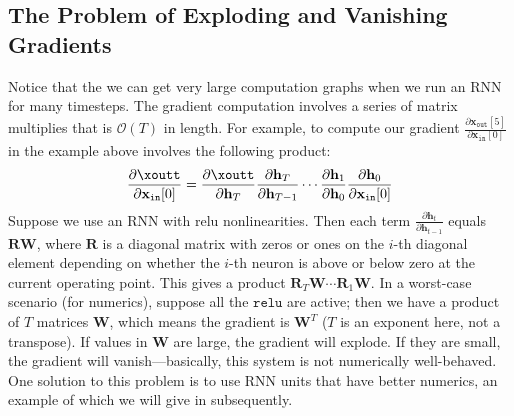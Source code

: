 \subsection{The Problem of Exploding and Vanishing Gradients}
\label{sec:recurrent_neural_networks:bptt} 

Notice that the we can get very large computation graphs when we run an RNN for many timesteps. The gradient computation involves a series of matrix multiplies that is $\mathcal{O}(T)$ in length. For example, to compute our gradient $\frac{\partial \mathbf{x}_{\texttt{out}}[5]}{\partial \mathbf{x}_{\texttt{in}}[0]}$ in the example above involves the following product: 
\begin{align}
\frac{\partial \xoutt}{\partial \mathbf{x}_{\texttt{in}}[0]} = \frac{\partial \xoutt}{\partial \mathbf{h}_T} \frac{\partial \mathbf{h}_T}{\partial \mathbf{h}_{T-1}} \cdots \frac{\partial \mathbf{h}_1}{\partial \mathbf{h}_0} \frac{\partial \mathbf{h}_0}{\partial \mathbf{x}_{\texttt{in}}[0]}
\end{align}
Suppose we use an RNN with relu nonlinearities. Then each term $\frac{\partial \mathbf{h}_t}{\partial \mathbf{h}_{t-1}}$ equals $\mathbf{R}\mathbf{W}$, where $\mathbf{R}$ is a diagonal matrix with zeros or ones on the $i$-th diagonal element depending on whether the $i$-th neuron is above or below zero at the current operating point. This gives a product $\mathbf{R}_T\mathbf{W}\cdots\mathbf{R}_1\mathbf{W}$. In a worst-case scenario (for numerics), suppose all the $\texttt{relu}$ are active; then we have a product of $T$ matrices $\mathbf{W}$, which means the gradient is $\mathbf{W}^T$ ($T$ is an exponent here, not a transpose). If values in $\mathbf{W}$ are large, the gradient will explode. If they are small, the gradient will vanish—basically, this system is not numerically well-behaved. One solution to this problem is to use RNN units that have better numerics, an example of which we will give in \sect{\ref{sec:recurrent_neural_networks:LSTMS}} subsequently.

